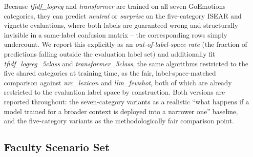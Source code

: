 \documentclass[higheredu,article,submit,pdftex,moreauthors]{Definitions/mdpi}
\begin{document}
Because \textit{tfidf\_logreg} and \textit{transformer} are trained on all seven GoEmotions categories, they can predict \textit{neutral} or \textit{surprise} on the five-category ISEAR and vignette evaluations, where both labels are guaranteed wrong and structurally invisible in a same-label confusion matrix -- the corresponding rows simply undercount. We report this explicitly as an \emph{out-of-label-space rate} (the fraction of predictions falling outside the evaluation label set) and additionally fit \textit{tfidf\_logreg\_5class} and \textit{transformer\_5class}, the same algorithms restricted to the five shared categories at training time, as the fair, label-space-matched comparison against \textit{nrc\_lexicon} and \textit{llm\_fewshot}, both of which are already restricted to the evaluation label space by construction. Both versions are reported throughout: the seven-category variants as a realistic ``what happens if a model trained for a broader context is deployed into a narrower one'' baseline, and the five-category variants as the methodologically fair comparison point.

\subsection{Faculty Scenario Set}
\label{sec:vignettes}
\end{document}
